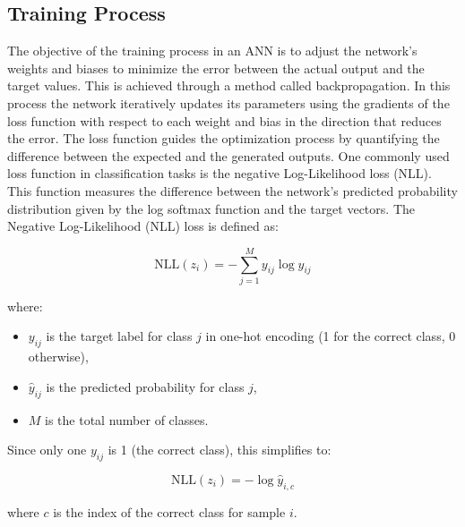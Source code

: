 \documentclass[12pt,fleqn,a4paper]{article}
\begin{document}
\subsection{Training Process}\label{sec:training_proc}
The objective of the training process in an ANN is to adjust the network's weights and biases to minimize the error between the actual output and the target values. This is achieved through a method called backpropagation. In this process the network iteratively updates its parameters using the gradients of the loss function with respect to each weight and bias in the direction that reduces the error. The loss function guides the optimization process by quantifying the difference between the expected and the generated outputs. One commonly used loss function in classification tasks is the negative Log-Likelihood loss (NLL). This function measures the difference between the network's predicted probability distribution given by the log softmax function and the target vectors. The Negative Log-Likelihood (NLL) loss is defined as:

\[
\text{NLL}(z_i) = -\sum_{j=1}^{M} y_{ij} \log \hat{y}_{ij}
\]

where:
\begin{itemize}
  \item \( y_{ij} \) is the target label for class \( j \) in one-hot encoding (1 for the correct class, 0 otherwise),
  \item \( \hat{y}_{ij} \) is the predicted probability for class \( j \),
  \item \( M \) is the total number of classes.
\end{itemize}

Since only one \( y_{ij} \) is 1 (the correct class), this simplifies to:

\[
\text{NLL}(z_i) = -\log \hat{y}_{i,c}
\]

where \( c \) is the index of the correct class for sample \( i \).
\end{document}
